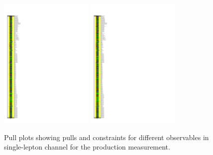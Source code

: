 \begin{figure}[ht]
  \centering
  \includegraphics[width=0.40\textwidth, viewport=0 375 150 750, clip]{figures/diff_xsec/ljet_tty_prod_mu_blinded/compare_NP_pulls/compare_NP_dilep_fits_pt_ptj1_eta/NuisPar_comp.pdf}%
  \includegraphics[width=0.40\textwidth, viewport=0 0 150 375, clip]{figures/diff_xsec/ljet_tty_prod_mu_blinded/compare_NP_pulls/compare_NP_dilep_fits_pt_ptj1_eta/NuisPar_comp.pdf}%
  \caption{Pull plots showing pulls and constraints for different observables in single-lepton channel for the \tty production measurement.}
  \label{fig:pull_plot_pt_tty_dec_free_ljet_mu_blinded}
\end{figure}

